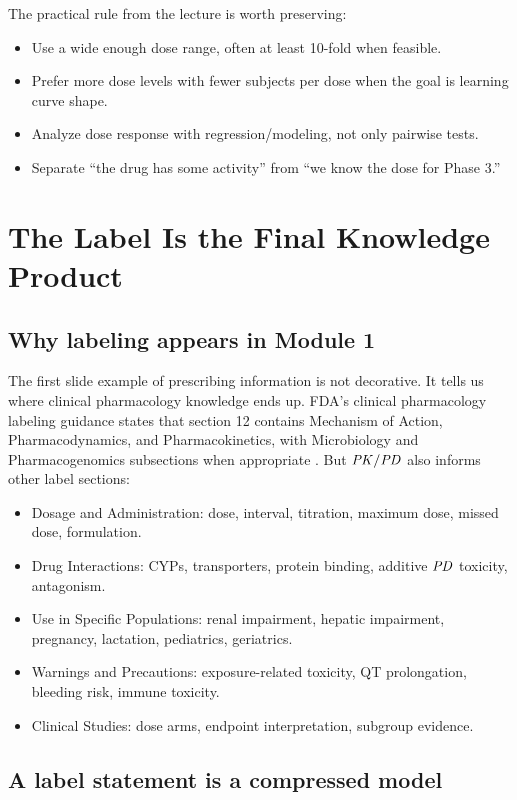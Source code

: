 \documentclass[a4paper]{article}
\newcommand{\PD}{\ensuremath{\pksym{PD}}}
\newcommand{\PKPD}{\ensuremath{\pksym{PK}/\pksym{PD}}}
\begin{document}
The practical rule from the lecture is worth preserving:
\begin{itemize}[leftmargin=2em]
  \item Use a wide enough dose range, often at least 10-fold when feasible.
  \item Prefer more dose levels with fewer subjects per dose when the goal is learning curve shape.
  \item Analyze dose response with regression/modeling, not only pairwise tests.
  \item Separate ``the drug has some activity'' from ``we know the dose for Phase 3.''
\end{itemize}

\section{The Label Is the Final Knowledge Product}

\subsection{Why labeling appears in Module 1}

The first slide example of prescribing information is not decorative. It tells us where clinical pharmacology knowledge ends up. FDA's clinical pharmacology labeling guidance states that section 12 contains Mechanism of Action, Pharmacodynamics, and Pharmacokinetics, with Microbiology and Pharmacogenomics subsections when appropriate \cite{fda2016clinicalPharmLabel}. But \PKPD{} also informs other label sections:
\begin{itemize}[leftmargin=2em]
  \item Dosage and Administration: dose, interval, titration, maximum dose, missed dose, formulation.
  \item Drug Interactions: CYPs, transporters, protein binding, additive \PD{} toxicity, antagonism.
  \item Use in Specific Populations: renal impairment, hepatic impairment, pregnancy, lactation, pediatrics, geriatrics.
  \item Warnings and Precautions: exposure-related toxicity, QT prolongation, bleeding risk, immune toxicity.
  \item Clinical Studies: dose arms, endpoint interpretation, subgroup evidence.
\end{itemize}

\subsection{A label statement is a compressed model}
\end{document}
